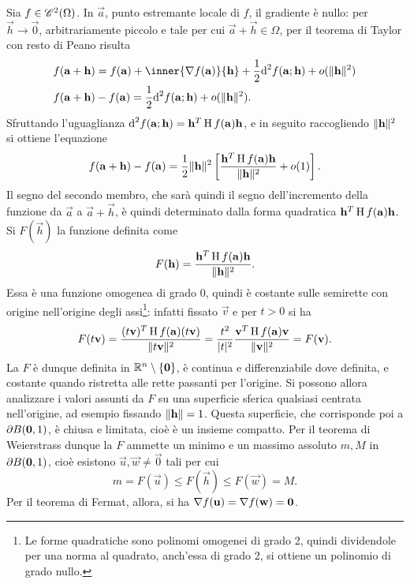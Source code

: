 Sia $f\in\cont[2]{\Omega}$. In $\vec a$, punto estremante locale di $f$, il gradiente è nullo: per $\vec h\to\vec 0$, arbitrariamente piccolo e tale per cui $\vec a+\vec h\in\Omega$, per il teorema di Taylor con resto di Peano risulta
\begin{align}
&f(\vec a+\vec h)=f(\vec a)+\inner{\grad f(\vec a)}{\vec h}+\frac12\dd^2f(\vec a;\vec h)+o(\norm{\vec h}^2)\\
&f(\vec a+\vec h)-f(\vec a)=\frac12\dd^2f(\vec a;\vec h)+o(\norm{\vec h}^2).
\end{align}
Sfruttando l'uguaglianza %
$\dd^2f(\vec a;\vec h)=\vec h^T\hes f(\vec a)\vec h$, e in seguito raccogliendo $\norm{\vec h}^2$ si ottiene l'equazione
\begin{equation}
f(\vec a+\vec h)-f(\vec a)=\frac12\norm{\vec h}^2\left[\frac{\vec h^T\hes f(\vec a)\vec h}{\norm{\vec h}^2}+o(1)\right].
\end{equation}
Il segno del secondo membro, che sarà quindi il segno dell'incremento della funzione da $\vec a$ a $\vec a+\vec h$, è quindi determinato dalla forma quadratica $\vec h^T\hes f(\vec a)\vec h$. Si $F(\vec h)$ la funzione definita come
\[
F(\vec h)=\frac{\vec h^T\hes f(\vec a)\vec h}{\norm{\vec h}^2}.
\]
Essa è una funzione omogenea di grado 0, quindi è costante sulle semirette con origine nell'origine degli assi\footnote{Le forme quadratiche sono polinomi omogenei di grado 2, quindi dividendole per una norma al quadrato, anch'essa di grado 2, si ottiene un polinomio di grado nullo.}: infatti fissato $\vec v$ e per $t>0$ si ha
\[
F(t\vec v)=\frac{(t\vec v)^T\hes f(\vec a)(t\vec v)}{\norm{t\vec v}^2}=\frac{t^2}{\abs{t}^2}\frac{\vec v^T\hes f(\vec a)\vec v}{\norm{\vec v}^2}=F(\vec v).
\]
La $F$ è dunque definita in $\R^n\setminus\{\vec 0\}$, è continua e differenziabile dove definita, e costante quando ristretta alle rette passanti per l'origine. Si possono allora analizzare i valori assunti da $F$ su una superficie sferica qualsiasi centrata nell'origine, ad esempio fissando $\norm{\vec h}=1$. Questa superficie, che corrisponde poi a $\boundary B(\vec 0,1)$, è chiusa e limitata, cioè è un insieme compatto. Per il teorema di Weierstrass dunque la $F$ ammette un minimo e un massimo assoluto $m,M$ in $\boundary B(\vec 0,1)$, cioè esistono $\vec u,\vec w\neq\vec 0$ tali per cui
\begin{equation} \label{eq:maxmin_quadratica}
m=F(\vec u)\leq F(\vec h)\leq F(\vec w)=M.
\end{equation}
Per il teorema di Fermat, allora, si ha $\grad f(\vec u)=\grad f(\vec w)=\vec 0$.
